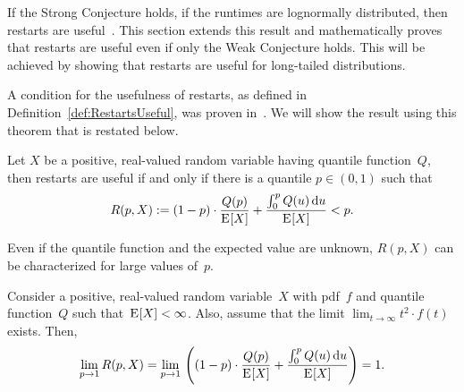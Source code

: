 If the Strong Conjecture holds, \ie if the runtimes are lognormally distributed, then restarts are useful~\cite{Lorenz18RuntimeDistributions}.
This section extends this result and mathematically proves that restarts are useful even if only the Weak Conjecture holds.
This will be achieved by showing that restarts are useful for long-tailed distributions.


A condition 
for the usefulness of restarts, as defined in %
Definition~\ref{def:RestartsUseful}, was 
proven
in~\cite{Lorenz18RuntimeDistributions}. %
We will show the result using this theorem that is restated below.

\begin{theorem}
	\label{theo:sufficient}
	Let $X$ be a positive, real-valued random variable having quantile function~$Q$, then restarts are useful if and only if there is a quantile $p \in (0,1)$ such that
	\begin{equation*}
		R(p,X) :=
		(1-p)\cdot \frac{Q(p)}{\expectation{X}}+\frac{\integralLow[u]{0}{p}{Q(u)}}{\expectation{X}}<p.
	\end{equation*}
\end{theorem}


Even if the quantile function and the expected value are unknown, 
$R(p,X)$
can be characterized for large values of~$p$.

\begin{lemma}
	\label{lem:exp_infinite_restart}
	Consider a positive, real-valued random variable~$X$ with pdf~$f$ and quantile function~$Q$ such that~\mbox{$\expectation{X}<\infty$}.
	Also, assume that the limit $\lim_{t\rightarrow\infty} t^2 \cdot f(t)$ exists.
	Then,
	\begin{align*}
		\lim\limits_{p\rightarrow 1} R(p,X)
		= \lim\limits_{p\rightarrow 1} \, \left((1-p)\cdot \frac{Q(p)}{\expectation{X}}+\frac{\integralLow[u]{0}{p}{Q(u)}}{\expectation{X}}\right)
		= 1.
	\end{align*}
\end{lemma}

